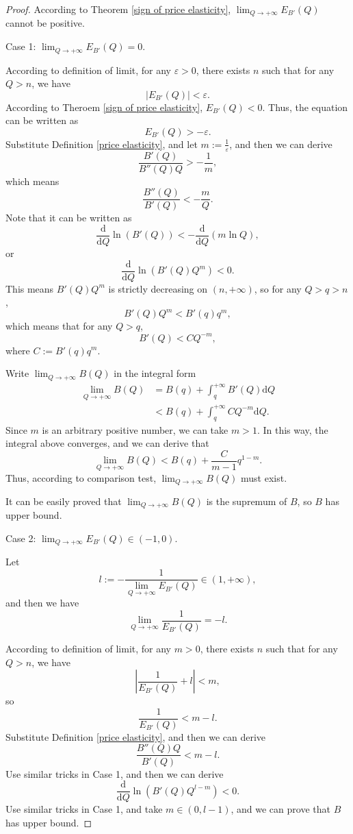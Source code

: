 \documentclass{article}
\begin{document}
\begin{proof}
According to Theorem \ref{sign of price elasticity},
$\lim_{Q\to+\infty}E_{B'}\left(Q\right)$ cannot be positive.

Case 1: $\lim_{Q\to+\infty}E_{B'}\left(Q\right)=0$.

According to definition of limit, for any $\varepsilon>0$, there exists $n$ such that for any $Q>n$, we have
$$\left|E_{B'}\left(Q\right)\right|<\varepsilon.$$
According to Theroem \ref{sign of price elasticity}, $E_{B'}\left(Q\right)<0$.
Thus, the equation can be written as
$$E_{B'}\left(Q\right)>-\varepsilon.$$
Substitute Definition \ref{price elasticity}, and let $m:=\frac1\varepsilon$, and then we can derive
$$\frac{B'\left(Q\right)}{B''\left(Q\right)Q}>-\frac1m,$$
which means
$$\frac{B''\left(Q\right)}{B'\left(Q\right)}<-\frac mQ.$$
Note that it can be written as
$$\frac{\mathrm d}{\mathrm dQ}\ln\left(B'\left(Q\right)\right)<-\frac{\mathrm d}{\mathrm dQ}\left(m\ln Q\right),$$
or
$$\frac{\mathrm d}{\mathrm dQ}\ln\left(B'\left(Q\right)Q^m\right)<0.$$
This means $B'\left(Q\right)Q^m$ is strictly decreasing on $\left(n,+\infty\right)$,
so for any $Q>q>n$,
$$B'\left(Q\right)Q^m<B'\left(q\right)q^m,$$
which means that for any $Q>q$,
$$B'\left(Q\right)<CQ^{-m},$$
where $C:=B'\left(q\right)q^m$.

Write $\lim_{Q\to+\infty}B\left(Q\right)$ in the integral form
\begin{align*}
\lim_{Q\to+\infty}B\left(Q\right)&=B\left(q\right)+\int_q^{+\infty}B'\left(Q\right)\mathrm dQ\\
&<B\left(q\right)+\int_q^{+\infty}CQ^{-m}\mathrm dQ.
\end{align*}
Since $m$ is an arbitrary positive number, we can take $m>1$.
In this way, the integral above converges, and we can derive that
$$\lim_{Q\to+\infty}B\left(Q\right)<B\left(q\right)+\frac C{m-1}q^{1-m}.$$
Thus, according to comparison test, $\lim_{Q\to+\infty}B\left(Q\right)$ must exist.

It can be easily proved that $\lim_{Q\to+\infty}B\left(Q\right)$ is the supremum of $B$, so $B$ has upper bound.

Case 2: $\lim_{Q\to+\infty}E_{B'}\left(Q\right)\in\left(-1,0\right)$.

Let
$$l:=-\frac1{\lim_{Q\to+\infty}E_{B'}\left(Q\right)}\in\left(1,+\infty\right),$$
and then we have
$$\lim_{Q\to+\infty}\frac1{E_{B'}\left(Q\right)}=-l.$$

According to definition of limit, for any $m>0$, there exists $n$ such that for any $Q>n$, we have
$$\left|\frac1{E_{B'}\left(Q\right)}+l\right|<m,$$
so
$$\frac1{E_{B'}\left(Q\right)}<m-l.$$
Substitute Definition \ref{price elasticity}, and then we can derive
$$\frac{B''\left(Q\right)Q}{B'\left(Q\right)}<m-l.$$
Use similar tricks in Case 1, and then we can derive
$$\frac{\mathrm d}{\mathrm dQ}\ln\left(B'\left(Q\right)Q^{l-m}\right)<0.$$
Use similar tricks in Case 1, and take $m\in\left(0,l-1\right)$,
and we can prove that $B$ has upper bound.
\end{proof}
\end{document}
